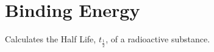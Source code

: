 \hypertarget{group___nuclear_binding_energy}{}\section{Binding Energy}
\label{group___nuclear_binding_energy}
Calculates the Half Life, $t_{\frac{1}{2}}$, of a radioactive substance. 
